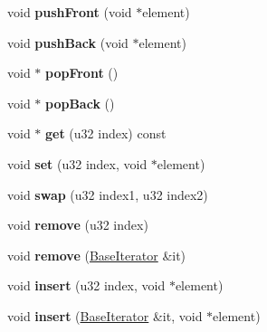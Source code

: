 \begin{DoxyCompactItemize}
\item 
void {\bfseries push\+Front} (void $\ast$element)\hypertarget{classDE_1_1BaseList_a5e6869690713975deafa0e055c977da0}{}\label{classDE_1_1BaseList_a5e6869690713975deafa0e055c977da0}

\item 
void {\bfseries push\+Back} (void $\ast$element)\hypertarget{classDE_1_1BaseList_a0178a7d3ce60727d0dc908e92479a5e0}{}\label{classDE_1_1BaseList_a0178a7d3ce60727d0dc908e92479a5e0}

\item 
void $\ast$ {\bfseries pop\+Front} ()\hypertarget{classDE_1_1BaseList_a3910c757374eee205c5e4fe66fa5b443}{}\label{classDE_1_1BaseList_a3910c757374eee205c5e4fe66fa5b443}

\item 
void $\ast$ {\bfseries pop\+Back} ()\hypertarget{classDE_1_1BaseList_a9db5355ad9a1e6ae10c1e179a7e816e6}{}\label{classDE_1_1BaseList_a9db5355ad9a1e6ae10c1e179a7e816e6}

\item 
void $\ast$ {\bfseries get} (u32 index) const \hypertarget{classDE_1_1BaseList_a8431d5d521a3620fea45c20da0d8e4b3}{}\label{classDE_1_1BaseList_a8431d5d521a3620fea45c20da0d8e4b3}

\item 
void {\bfseries set} (u32 index, void $\ast$element)\hypertarget{classDE_1_1BaseList_add70f7c86284bf46795159ca2ac49960}{}\label{classDE_1_1BaseList_add70f7c86284bf46795159ca2ac49960}

\item 
void {\bfseries swap} (u32 index1, u32 index2)\hypertarget{classDE_1_1BaseList_a9bcf75745e1644fd87a12e439afc5c9c}{}\label{classDE_1_1BaseList_a9bcf75745e1644fd87a12e439afc5c9c}

\item 
void {\bfseries remove} (u32 index)\hypertarget{classDE_1_1BaseList_ae15c3960b5603ca12e1e6560bb922b6a}{}\label{classDE_1_1BaseList_ae15c3960b5603ca12e1e6560bb922b6a}

\item 
void {\bfseries remove} (\hyperlink{classDE_1_1BaseList_1_1BaseIterator}{Base\+Iterator} \&it)\hypertarget{classDE_1_1BaseList_ad89a50036ae9fcffa04d9dd3ed4de5b8}{}\label{classDE_1_1BaseList_ad89a50036ae9fcffa04d9dd3ed4de5b8}

\item 
void {\bfseries insert} (u32 index, void $\ast$element)\hypertarget{classDE_1_1BaseList_a84bd701e006411b4c30bd482c3c48a81}{}\label{classDE_1_1BaseList_a84bd701e006411b4c30bd482c3c48a81}

\item 
void {\bfseries insert} (\hyperlink{classDE_1_1BaseList_1_1BaseIterator}{Base\+Iterator} \&it, void $\ast$element)\hypertarget{classDE_1_1BaseList_a74dc509dbca3bca1ff7bb420d249a556}{}\label{classDE_1_1BaseList_a74dc509dbca3bca1ff7bb420d249a556}

\end{DoxyCompactItemize}
